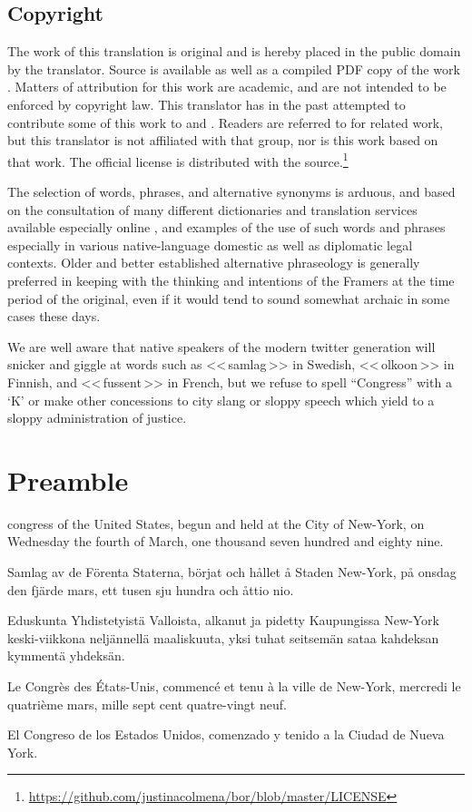\documentclass[a4paper,landscape,10pt]{article}
\newcommand{\tblock}[5]{\noindent\begin{minipage}[t]{0.18\textwidth}\foreignlanguage{english}{#1}\end{minipage}\hskip 0.025\textwidth\begin{minipage}[t]{0.18\textwidth}\foreignlanguage{swedish}{#2}\end{minipage}\hskip 0.025\textwidth\begin{minipage}[t]{0.18\textwidth}\foreignlanguage{finnish}{#3}\end{minipage}\hskip 0.025\textwidth\begin{minipage}[t]{0.18\textwidth}\foreignlanguage{french}{#4}\end{minipage}\hskip 0.025\textwidth\begin{minipage}[t]{0.18\textwidth}\foreignlanguage{spanish}{#5}\end{minipage}}
\begin{document}
\begin{multicols}{3}
\section*{Copyright}

The work of this translation is original and is hereby placed in the public domain by the translator. Source \cite{src} is available as well as a compiled PDF copy of the work \cite{doc}. Matters of attribution for this work are academic, and are not intended to be enforced by copyright law. This translator has in the past attempted to contribute some of this work to \cite{wp-bor-sv} and \cite{wp-bor-fi}. Readers are referred to \cite{jpfo-bor} for related work, but this translator is not affiliated with that group, nor is this work based on that work.  The official license is distributed with the source.\footnote{\url{https://github.com/justinacolmena/bor/blob/master/LICENSE}}

	The selection of words, phrases, and alternative synonyms is arduous, and based on the consultation of many different dictionaries and translation services available especially online \cite[etc.]{bab.la,google-translate,collins-en-fr,lexilogos-fr,free-en-fi,lexilogos-fi}, and examples of the use of such words and phrases especially in various native-language domestic as well as diplomatic legal contexts. Older and better established alternative phraseology is generally preferred in keeping with the thinking and intentions of the Framers at the time period of the original, even if it would tend to sound somewhat archaic in some cases these days.

	We are well aware that native speakers of the modern twitter generation will snicker and giggle at words such as \foreignlanguage{swedish}{<<\,samlag\,>>} in Swedish, \foreignlanguage{finnish}{<<\,olkoon\,>>} in Finnish, and \foreignlanguage{french}{<<\,fussent\,>>} in French, but we refuse to spell ``Congress'' with a `K' or make other concessions to city slang or sloppy speech which yield to a sloppy administration of justice.
\end{multicols}

\section*{Preamble}

\tblock
{\Gls{congress} of the United States, begun and held at the City of New-York, on Wednesday the fourth of March, one thousand seven hundred and eighty nine.}
{Samlag av de Förenta Staterna, börjat och hållet å Staden New-York, på onsdag den fjärde mars, ett tusen sju hundra och åttio nio.}
{Eduskunta Yhdistetyistä Valloista, alkanut ja pidetty Kaupungissa New-York keski-viikkona neljännellä maaliskuuta, yksi tuhat seitsemän sataa kahdeksan kymmentä yhdeksän.}
{Le Congrès des États-Unis, commencé et tenu à la ville de New-York, mercredi le quatrième mars, mille sept cent quatre-vingt neuf.}
{El Congreso de los Estados Unidos, comenzado y tenido a la Ciudad de Nueva York.}
\end{document}

